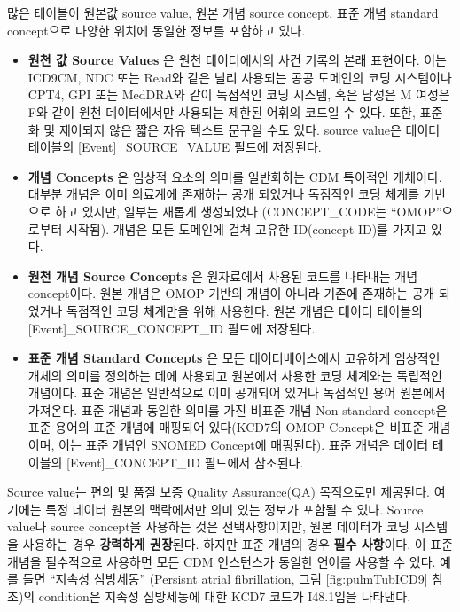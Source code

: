 \documentclass[10.5pt]{book}
\providecommand{\tightlist}{%
  \setlength{\itemsep}{0pt}\setlength{\parskip}{0pt}}
\theoremstyle{definition}
\theoremstyle{definition}
\theoremstyle{definition}
\theoremstyle{remark}
\begin{document}
많은 테이블이 원본값 source value, 원본 개념 source concept, 표준 개념
standard concept으로 다양한 위치에 동일한 정보를 포함하고 있다.

\begin{itemize}
\tightlist
\item
  \textbf{원천 값 Source Values} 은 원천 데이터에서의 사건 기록의 본래
  표현이다. 이는 ICD9CM, NDC 또는 Read와 같은 널리 사용되는 공공
  도메인의 코딩 시스템이나 CPT4, GPI 또는 MedDRA와 같이 독점적인 코딩
  시스템, 혹은 남성은 M 여성은 F와 같이 원천 데이터에서만 사용되는
  제한된 어휘의 코드일 수 있다. 또한, 표준화 및 제어되지 않은 짧은 자유
  텍스트 문구일 수도 있다. source value은 데이터 테이블의
  {[}Event{]}\_SOURCE\_VALUE 필드에 저장된다.
\item
  \textbf{개념 Concepts} 은 임상적 요소의 의미를 일반화하는 CDM 특이적인
  개체이다. 대부분 개념은 이미 의료계에 존재하는 공개 되었거나 독점적인
  코딩 체계를 기반으로 하고 있지만, 일부는 새롭게 생성되었다
  (CONCEPT\_CODE는 ``OMOP''으로부터 시작됨). 개념은 모든 도메인에 걸쳐
  고유한 ID(concept ID)를 가지고 있다.
\item
  \textbf{원천 개념 Source Concepts} 은 원자료에서 사용된 코드를
  나타내는 개념 concept이다. 원본 개념은 OMOP 기반의 개념이 아니라
  기존에 존재하는 공개 되었거나 독점적인 코딩 체계만을 위해 사용한다.
  원본 개념은 데이터 테이블의 {[}Event{]}\_SOURCE\_CONCEPT\_ID 필드에
  저장된다.
\item
  \textbf{표준 개념 Standard Concepts} 은 모든 데이터베이스에서 고유하게
  임상적인 개체의 의미를 정의하는 데에 사용되고 원본에서 사용한 코딩
  체계와는 독립적인 개념이다. 표준 개념은 일반적으로 이미 공개되어
  있거나 독점적인 용어 원본에서 가져온다. 표준 개념과 동일한 의미를 가진
  비표준 개념 Non-standard concept은 표준 용어의 표준 개념에 매핑되어
  있다(KCD7의 OMOP Concept은 비표준 개념이며, 이는 표준 개념인 SNOMED
  Concept에 매핑된다). 표준 개념은 데이터 테이블의
  {[}Event{]}\_CONCEPT\_ID 필드에서 참조된다.
\end{itemize}

Source value는 편의 및 품질 보증 Quality Assurance(QA) 목적으로만
제공된다. 여기에는 특정 데이터 원본의 맥락에서만 의미 있는 정보가 포함될
수 있다. Source value나 source concept을 사용하는 것은 선택사항이지만,
원본 데이터가 코딩 시스템을 사용하는 경우 \textbf{강력하게 권장}된다.
하지만 표준 개념의 경우 \textbf{필수 사항}이다. 이 표준 개념을
필수적으로 사용하면 모든 CDM 인스턴스가 동일한 언어를 사용할 수 있다.
예를 들면 ``지속성 심방세동'' (Persisnt atrial fibrillation, 그림
\ref{fig:pulmTubICD9} 참조)의 condition은 지속성 심방세동에 대한 KCD7
코드가 I48.1임을 나타낸다.
\end{document}
